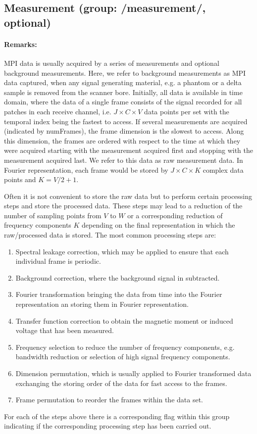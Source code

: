 \documentclass[landscape,a4paper]{article} %
\newcommand{\inlvar}[1]{{\ttfamily#1}}
\begin{document}
\subsection{Measurement (group: \inlvar{/measurement/}, optional)}
\begin{multicols}{2}

\paragraph{Remarks:}
MPI data is usually acquired by a series of measurements and optional background measurements. Here, we refer to background measurements as MPI data captured, when any signal generating material, e.g. a phantom or a delta sample is removed from the scanner bore. Initially, all data is available in time domain, where the data of a single frame consists of the signal recorded for all patches in each receive channel, i.e. $J \times C \times V$ data points per set with the temporal index being the fastest to access.  If several measurements are acquired (indicated by \inlvar{numFrames}), the frame dimension is the slowest to access. Along this dimension, the frames are ordered with respect to the time at which they were acquired starting with the measurement acquired first and stopping with the measurement acquired last. We refer to this data as raw measurement data. In Fourier representation, each frame would be stored by $J \times C\times K$ complex data points and $K = V/2 +1$.

Often it is not convenient to store the raw data but to perform certain processing steps and store the processed data. These steps may lead to a reduction of the number of sampling points from $V$ to $W$ or a corresponding reduction of frequency components $K$ depending on the final representation in which the raw/processed data is stored. The most common processing steps are:
\begin{enumerate}
	\item Spectral leakage correction, which may be applied to ensure that each individual frame is periodic.
	\item Background correction, where the background signal in subtracted.
	\item Fourier transformation bringing the data from time into the Fourier representation an storing them in Fourier representation.
	\item Transfer function correction to obtain the magnetic moment or induced voltage that has been measured.
	\item Frequency selection to reduce the number of frequency components, e.g. bandwidth reduction or selection of high signal frequency components.
	\item Dimension permutation, which is usually applied to Fourier transformed data exchanging the storing order of the data for fast access to the frames.
	\item Frame permutation to reorder the frames within the data set.
\end{enumerate}
For each of the steps above there is a corresponding flag within this group indicating if the corresponding processing step has been carried out. 


\end{multicols}
\end{document}

